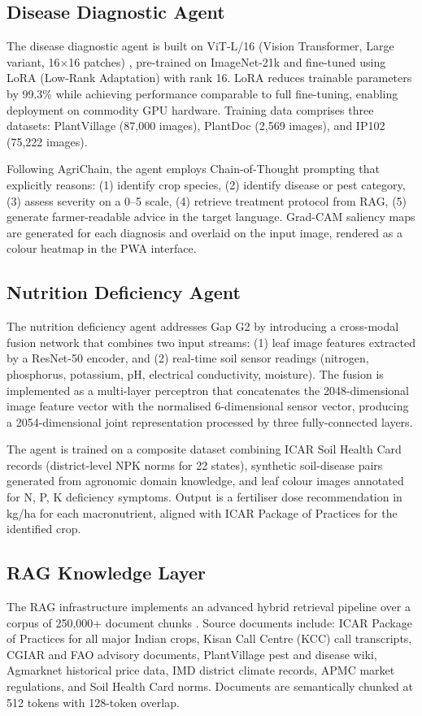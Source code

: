 \documentclass[12pt,a4paper]{article}
\begin{document}
\subsection{Disease Diagnostic Agent}
The disease diagnostic agent is built on ViT-L/16 (Vision Transformer, Large variant, 16$\times$16 patches) \citep{vit2021}, pre-trained on ImageNet-21k and fine-tuned using LoRA (Low-Rank Adaptation) \citep{lora2022} with rank 16. LoRA reduces trainable parameters by 99.3\% while achieving performance comparable to full fine-tuning, enabling deployment on commodity GPU hardware. Training data comprises three datasets: PlantVillage (87,000 images), PlantDoc (2,569 images), and IP102 (75,222 images).

Following AgriChain, the agent employs Chain-of-Thought prompting that explicitly reasons: (1) identify crop species, (2) identify disease or pest category, (3) assess severity on a 0--5 scale, (4) retrieve treatment protocol from RAG, (5) generate farmer-readable advice in the target language. Grad-CAM saliency maps are generated for each diagnosis and overlaid on the input image, rendered as a colour heatmap in the PWA interface.

\subsection{Nutrition Deficiency Agent}
The nutrition deficiency agent addresses Gap G2 by introducing a cross-modal fusion network that combines two input streams: (1) leaf image features extracted by a ResNet-50 encoder, and (2) real-time soil sensor readings (nitrogen, phosphorus, potassium, pH, electrical conductivity, moisture). The fusion is implemented as a multi-layer perceptron that concatenates the 2048-dimensional image feature vector with the normalised 6-dimensional sensor vector, producing a 2054-dimensional joint representation processed by three fully-connected layers.

The agent is trained on a composite dataset combining ICAR Soil Health Card records (district-level NPK norms for 22 states), synthetic soil-disease pairs generated from agronomic domain knowledge, and leaf colour images annotated for N, P, K deficiency symptoms. Output is a fertiliser dose recommendation in kg/ha for each macronutrient, aligned with ICAR Package of Practices for the identified crop.

\subsection{RAG Knowledge Layer}
The RAG infrastructure implements an advanced hybrid retrieval pipeline over a corpus of 250,000+ document chunks \citep{rag2020}. Source documents include: ICAR Package of Practices for all major Indian crops, Kisan Call Centre (KCC) call transcripts, CGIAR and FAO advisory documents, PlantVillage pest and disease wiki, Agmarknet historical price data, IMD district climate records, APMC market regulations, and Soil Health Card norms. Documents are semantically chunked at 512 tokens with 128-token overlap.
\end{document}
